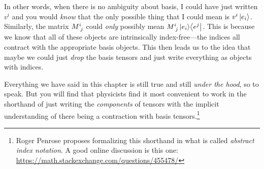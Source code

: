 In other words, when there is no ambiguity about basis, I could have just written $v^i$ and you would \emph{know} that the only possible thing that I could mean is $v^i\left|e_i\right\rangle$. Similarly, the matrix $M\aij{i}{j}$ could \emph{only} possibly mean $M\aij{i}{j}\ket{e_i}\!\bra{e^j}$. This is because we know that all of these objects are intrinsically index-free---the indices all contract with the appropriate basis objects. This then leads us to the idea that maybe we could just \emph{drop} the basis tensors and just write everything as objects with indices.

Everything we have said in this chapter is still true and still \emph{under the hood}, so to speak. But you will find that physicists find it most convenient to work in the shorthand of just writing the \emph{components} of tensors with the implicit understanding of there being a contraction with basis tensors.\footnote{Roger Penrose proposes formalizing this shorthand in what is called \emph{abstract index notation}. A good online discussion is this one: \url{https://math.stackexchange.com/questions/455478/}} 



